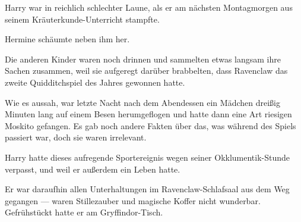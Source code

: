 \later

Harry war in reichlich schlechter Laune, als er am nächsten Montagmorgen aus seinem Kräuterkunde-Unterricht stampfte.

Hermine schäumte neben ihm her.

Die anderen Kinder waren noch drinnen und sammelten etwas langsam ihre Sachen zusammen, weil sie aufgeregt darüber brabbelten, dass Ravenclaw das zweite Quidditchspiel des Jahres gewonnen hatte.

Wie es aussah, war letzte Nacht nach dem Abendessen ein Mädchen dreißig Minuten lang auf einem Besen herumgeflogen und hatte dann eine Art riesigen Moskito gefangen. Es gab noch andere Fakten über das, was während des Spiels passiert war, doch sie waren irrelevant.

Harry hatte dieses aufregende Sportereignis wegen seiner Okklumentik-Stunde verpasst, und weil er außerdem ein Leben hatte.

Er war daraufhin allen Unterhaltungen im Ravenclaw-Schlafsaal aus dem Weg gegangen — waren Stillezauber und magische Koffer nicht wunderbar. Gefrühstückt hatte er am Gryffindor-Tisch.

